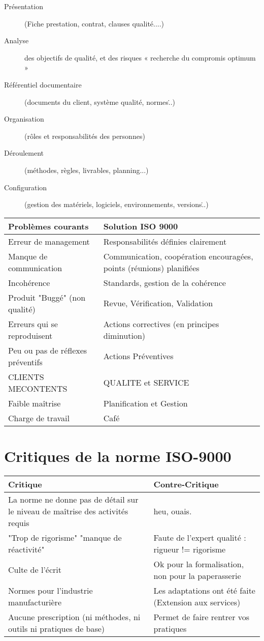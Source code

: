 \begin{description}
	\item[Présentation] (Fiche prestation, contrat, clauses qualité....)
	\item[Analyse] des objectifs de qualité, et des risques « recherche du compromis optimum »
	\item[Référentiel documentaire] (documents du client, système qualité, normes\...)
	\item[Organisation] (rôles et responsabilités des personnes)
	\item[Déroulement] (méthodes, règles, livrables, planning...)
	\item[Configuration] (gestion des matériels, logiciels, environnements, versions\...)
\end{description}

\begin{tabular}{|p{7cm}|p{7cm}|}
	\hline
	Problèmes courants & Solution ISO 9000 \\
	\hline
	\hline
	Erreur de management & Responsabilités définies clairement \\
	\hline
	Manque de communication & Communication, coopération
	encouragées, points (réunions) planifiées\\
	\hline
	Incohérence & Standards, gestion de la cohérence \\
	\hline
	Produit "Buggé" (non qualité) & Revue, Vérification, Validation\\
	\hline
	Erreurs qui se reproduisent & Actions correctives (en principes diminution)\\
	\hline
	Peu ou pas de réflexes préventifs & Actions Préventives\\
	\hline
	CLIENTS MECONTENTS & QUALITE et SERVICE\\
	\hline
	Faible maîtrise & Planification et Gestion\\
	\hline
	Charge de travail & Café \\
    \hline
\end{tabular}


\section{Critiques de la norme ISO-9000}
\begin{tabular}{|p{7cm}|p{7cm}|}
	\hline
	Critique & Contre-Critique\\
	\hline
	\hline
	La norme ne donne pas de détail sur le niveau de maîtrise des activités requis & heu, ouais.\\
	\hline
	"Trop de rigorisme" "manque de réactivité" & Faute de l’expert qualité : rigueur != rigorisme \\
	\hline
	Culte de l’écrit & Ok pour la formalisation, non pour la paperasserie\\
	\hline
	Normes pour l'industrie manufacturière & Les adaptations ont été faite (Extension aux services)\\
	\hline
	Aucune prescription (ni méthodes, ni outils ni pratiques de base) & Permet de faire rentrer vos pratiques\\
\hline
\end{tabular}


